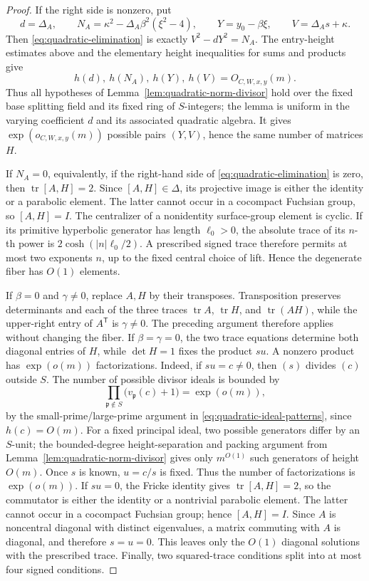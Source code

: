 \documentclass[11pt,reqno]{amsart}
\theoremstyle{definition}
\theoremstyle{remark}
\newcommand{\Tr}{\operatorname{tr}}
\begin{document}
\begin{proof}
If the right side is nonzero,
put
\[
 d=\Delta_A,\qquad
 N_A=\kappa^2-\Delta_A\beta^2(\xi^2-4),\qquad
 Y=y_0-\beta\xi,\qquad V=\Delta_As+\kappa.
\]
Then \eqref{eq:quadratic-elimination} is exactly
\(V^2-dY^2=N_A\).  The entry-height estimates above and the elementary
height inequalities for sums and products give
\[
 h(d),\ h(N_A),\ h(Y),\ h(V)=O_{C,W,x,y}(m).
\]
Thus all hypotheses of Lemma~\ref{lem:quadratic-norm-divisor} hold over the
fixed base splitting field and its fixed ring of \(S\)-integers; the lemma is
uniform in the varying coefficient \(d\) and its associated quadratic
algebra.  It gives
\(\exp(o_{C,W,x,y}(m))\) possible
pairs \((Y,V)\), hence the same number of matrices \(H\).

If \(N_A=0\), equivalently, if the right-hand side of
\eqref{eq:quadratic-elimination} is zero, then \(\Tr[A,H]=2\).  Since
\([A,H]\in\Delta\), its projective image is
either the identity or a parabolic element.  The latter cannot occur in a
cocompact Fuchsian group, so \([A,H]=I\).  The centralizer of a nonidentity surface-group
element is cyclic.  If its primitive hyperbolic generator has length
\(\ell_0>0\), the absolute trace of its \(n\)-th power is
\(2\cosh(|n|\ell_0/2)\).  A prescribed signed trace therefore permits at
most two exponents \(n\), up to the fixed central choice of lift.  Hence the
degenerate fiber has \(O(1)\) elements.

If \(\beta=0\) and \(\gamma\ne0\), replace \(A,H\) by their transposes.
Transposition preserves determinants and each of the three traces
\(\Tr A\), \(\Tr H\), and \(\Tr(AH)\), while the upper-right entry of
\(A^{\mathsf T}\) is \(\gamma\ne0\).  The preceding argument therefore
applies without changing the fiber.  If
\(\beta=\gamma=0\), the two trace equations determine both diagonal entries
of \(H\), while \(\det H=1\) fixes the product \(su\).  A nonzero product
has \(\exp(o(m))\) factorizations.  Indeed, if \(su=c\ne0\), then
\((s)\) divides \((c)\) outside \(S\).  The number of possible divisor
ideals is bounded by
\[
 \prod_{\mathfrak p\notin S}
       \bigl(v_{\mathfrak p}(c)+1\bigr)=\exp(o(m)),
\]
by the small-prime/large-prime argument in
\eqref{eq:quadratic-ideal-patterns}, since \(h(c)=O(m)\).  For a fixed
principal ideal, two possible generators differ by an \(S\)-unit; the
bounded-degree height-separation and packing argument from
Lemma~\ref{lem:quadratic-norm-divisor} gives only \(m^{O(1)}\) such
generators of height \(O(m)\).  Once \(s\) is known, \(u=c/s\) is fixed.
Thus the number of factorizations is \(\exp(o(m))\).  If \(su=0\), the
Fricke identity gives \(\Tr[A,H]=2\), so the commutator is either the
identity or a
nontrivial parabolic element.  The latter cannot occur in a cocompact
Fuchsian group; hence \([A,H]=I\).  Since \(A\) is noncentral diagonal with
distinct eigenvalues, a matrix commuting with \(A\) is diagonal, and
therefore \(s=u=0\).  This leaves only the \(O(1)\) diagonal solutions with
the prescribed trace.  Finally, two squared-trace conditions split into at
most four signed conditions.
\end{proof}
\end{document}
